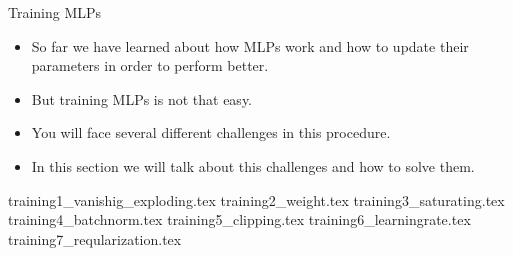 \begin{frame}{Training MLPs}
	\begin{itemize}
		\item So far we have learned about how MLPs work and how to update their parameters in order to perform better.
		\item But training MLPs is not that easy.
		\item You will face several different challenges in this procedure.
		\item In this section we will talk about this challenges and how to solve them.
	\end{itemize}
\end{frame}

{training1_vanishig_exploding.tex}
{training2_weight.tex}
{training3_saturating.tex}
{training4_batchnorm.tex}
{training5_clipping.tex}
{training6_learningrate.tex}
{training7_reqularization.tex}
